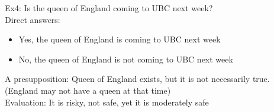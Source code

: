 Ex4: Is the queen of England coming to UBC next week?\\
Direct answers:
\begin{itemize}
    \item Yes, the queen of England is coming to UBC next week
    \item No, the queen of England is not coming to UBC next week
\end{itemize}
A presupposition: Queen of England exists, but it is not necessarily true. (England may not have a queen at that time)\\
Evaluation: It is risky, not safe, yet it is moderately safe